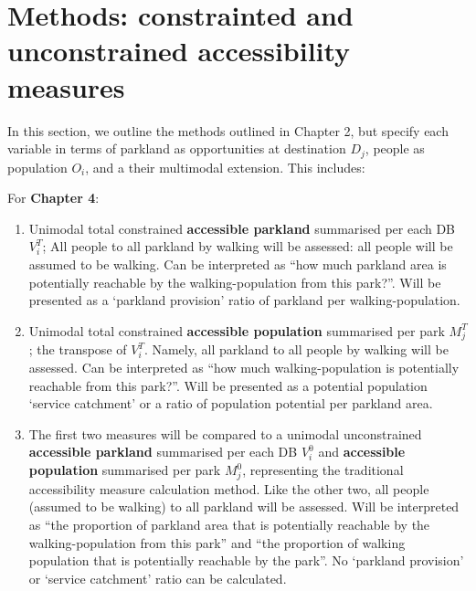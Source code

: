 \documentclass[
11pt, %
oneside, %
english, %
singlespacing, %
]{macthesis} %
\def\tightlist{}
\begin{document}
\section{Methods: constrainted and unconstrained accessibility measures}\label{methods-constrainted-and-unconstrained-accessibility-measures}

In this section, we outline the methods outlined in Chapter 2, but specify each variable in terms of parkland as opportunities at destination \(D_j\), people as population \(O_i\), and a their multimodal extension. This includes:

For \textbf{Chapter 4}:

\begin{enumerate}
\def\labelenumi{\arabic{enumi}.}
\tightlist
\item
  Unimodal total constrained \textbf{accessible parkland} summarised per each DB \(V_i^T\); All people to all parkland by walking will be assessed: all people will be assumed to be walking. Can be interpreted as ``how much parkland area is potentially reachable by the walking-population from this park?''. Will be presented as a `parkland provision' ratio of parkland per walking-population.
\item
  Unimodal total constrained \textbf{accessible population} summarised per park \(M_j^T\); the transpose of \(V_i^T\). Namely, all parkland to all people by walking will be assessed. Can be interpreted as ``how much walking-population is potentially reachable from this park?''. Will be presented as a potential population `service catchment' or a ratio of population potential per parkland area.
\item
  The first two measures will be compared to a unimodal unconstrained \textbf{accessible parkland} summarised per each DB \(V_i^0\) and \textbf{accessible population} summarised per park \(M_j^0\), representing the traditional accessibility measure calculation method. Like the other two, all people (assumed to be walking) to all parkland will be assessed. Will be interpreted as ``the proportion of parkland area that is potentially reachable by the walking-population from this park'' and ``the proportion of walking population that is potentially reachable by the park''. No `parkland provision' or `service catchment' ratio can be calculated.
\end{enumerate}
\end{document}
